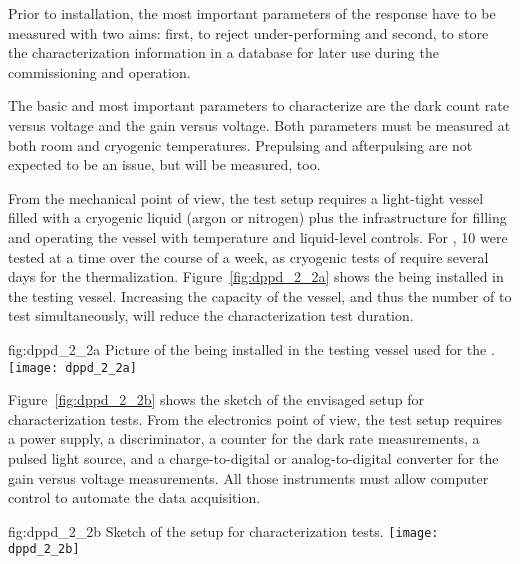 Prior to installation, the most important parameters of the  response have to be measured with two aims: first, to reject under-performing  and second, to store the characterization information in a database for later use during the  commissioning and operation.

The basic and most important parameters to characterize are the dark count rate versus voltage and the gain versus voltage. Both parameters must be measured at both room and  cryogenic temperatures. Prepulsing and afterpulsing are not expected to be an issue, but will be measured, too. 

From the mechanical point of view, the test setup requires a light-tight vessel filled with a cryogenic liquid (argon or nitrogen) plus the infrastructure for filling and operating the vessel with temperature and liquid-level controls. For , \num{10}  were tested at a time %
over the course of a week, as cryogenic tests of  
require several days for the  thermalization. Figure~\ref{fig:dppd_2_2a} shows the    being installed in the testing vessel. %
Increasing the capacity of the vessel, and thus the number of  to test simultaneously, %
will reduce the characterization test duration.

\begin{dunefigure}{fig:dppd_2_2a}
{Picture of the  being installed in the testing vessel used for the  .}
\texttt{[image: dppd\_2\_2a]}
\end{dunefigure}

Figure~\ref{fig:dppd_2_2b} shows the sketch of the envisaged setup for  characterization tests. From the electronics point of view, the test setup requires a  power supply, a discriminator, a counter for the dark rate measurements, a pulsed light source, and a charge-to-digital or analog-to-digital converter for the  gain versus voltage measurements. All those instruments must allow computer control to automate the data acquisition.

\begin{dunefigure}{fig:dppd_2_2b}
{Sketch of the setup for  characterization tests.}
\texttt{[image: dppd\_2\_2b]}
\end{dunefigure}

